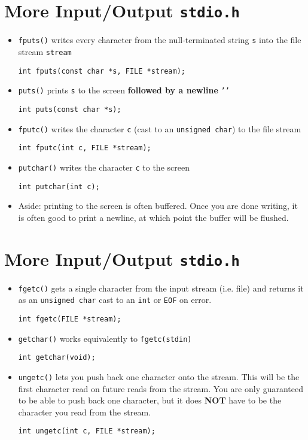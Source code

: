 \documentclass{article}
\begin{document}
\section{More Input/Output \texttt{stdio.h}}
\begin{itemize}
\item \texttt{fputs()} writes every character from the null-terminated string \texttt{s} into the file stream \texttt{stream}
\begin{verbatim}
int fputs(const char *s, FILE *stream);
\end{verbatim}
\item \texttt{puts()} prints \texttt{s} to the screen \textbf{followed by a newline} \texttt{'\n'}
\begin{verbatim}
int puts(const char *s);
\end{verbatim}
\item \texttt{fputc()} writes the character \texttt{c} (cast to an \texttt{unsigned char}) to the file stream
\begin{verbatim}
int fputc(int c, FILE *stream);
\end{verbatim}
\item \texttt{putchar()} writes the character \texttt{c} to the screen
\begin{verbatim}
int putchar(int c);
\end{verbatim}

\item Aside: printing to the screen is often buffered. Once you are done writing, it is often good to print a newline, at which point the buffer will be flushed.
\end{itemize}



\section{More Input/Output \texttt{stdio.h}}
\begin{itemize}
\item \texttt{fgetc()} gets a single character from the input stream (i.e. file) and returns it as an \texttt{unsigned char} cast to an \texttt{int} or \texttt{EOF} on error.
\begin{verbatim}
int fgetc(FILE *stream);
\end{verbatim}
\item \texttt{getchar()} works equivalently to \texttt{fgetc(stdin)}
\begin{verbatim}
int getchar(void);
\end{verbatim}
\item \texttt{ungetc()} lets you push back one character onto the stream. This will be the first character read on future reads from the stream. You are only guaranteed to be able to push back one character, but it does \textbf{NOT} have to be the character you read from the stream.
\begin{verbatim}
int ungetc(int c, FILE *stream);
\end{verbatim}
\end{itemize}
\end{document}
